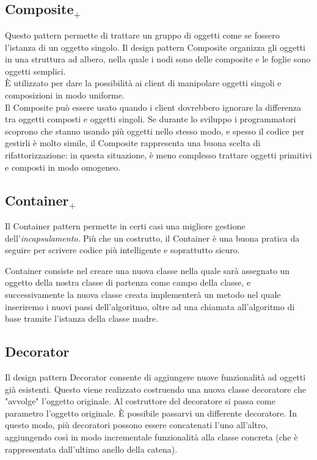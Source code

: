 \subsection{Composite$_+$}
Questo pattern permette di trattare un gruppo di oggetti come se fossero l'istanza di un oggetto singolo. 
Il design pattern Composite organizza gli oggetti in una struttura ad albero, nella quale i nodi sono delle composite e le foglie sono oggetti semplici.\\

È utilizzato per dare la possibilità ai client di manipolare oggetti singoli e composizioni in modo uniforme. \\
Il Composite può essere usato quando i client dovrebbero ignorare la differenza tra oggetti composti e oggetti singoli. 
Se durante lo sviluppo i programmatori scoprono che stanno usando più oggetti nello stesso modo, e spesso il codice per gestirli è molto simile, il Composite rappresenta una buona scelta di rifattorizzazione: in questa situazione, è meno complesso trattare oggetti primitivi e composti in modo omogeneo.

\subsection{Container$_+$}
Il Container pattern permette in certi casi una migliore gestione dell'\textit{incapsulamento}. Più che un costrutto, il Container è una buona pratica da seguire per scrivere codice più intelligente e soprattutto sicuro. 

Container consiste nel creare una nuova classe nella quale sarà assegnato un oggetto della nostra classe di partenza come campo della classe, e successivamente la nuova classe creata implementerà un metodo nel quale inseriremo i nuovi passi dell'algoritmo, oltre ad una chiamata all'algoritmo di base tramite l'istanza della classe madre.

\subsection{Decorator}
Il design pattern Decorator consente di aggiungere nuove funzionalità ad oggetti già esistenti. 
Questo viene realizzato costruendo una nuova classe decoratore che "avvolge" l'oggetto originale. 
Al costruttore del decoratore si passa come parametro l'oggetto originale. È possibile passarvi un differente decoratore. In questo modo, più decoratori possono essere concatenati l'uno all'altro, aggiungendo così in modo incrementale funzionalità alla classe concreta (che è rappresentata dall'ultimo anello della catena).

